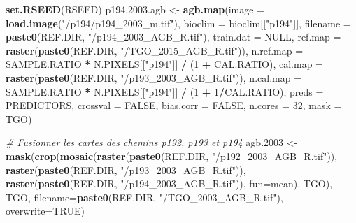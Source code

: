 \documentclass[a4paper, notitlepage, 12pt, krantz2]{krantz}
\newenvironment{Shaded}{\begin{snugshade}}{\end{snugshade}}
\newcommand{\CommentTok}[1]{\textcolor[rgb]{0.56,0.35,0.01}{\textit{#1}}}
\newcommand{\DataTypeTok}[1]{\textcolor[rgb]{0.13,0.29,0.53}{#1}}
\newcommand{\DecValTok}[1]{\textcolor[rgb]{0.00,0.00,0.81}{#1}}
\newcommand{\FloatTok}[1]{\textcolor[rgb]{0.00,0.00,0.81}{#1}}
\newcommand{\KeywordTok}[1]{\textcolor[rgb]{0.13,0.29,0.53}{\textbf{#1}}}
\newcommand{\NormalTok}[1]{#1}
\newcommand{\OperatorTok}[1]{\textcolor[rgb]{0.81,0.36,0.00}{\textbf{#1}}}
\newcommand{\OtherTok}[1]{\textcolor[rgb]{0.56,0.35,0.01}{#1}}
\newcommand{\StringTok}[1]{\textcolor[rgb]{0.31,0.60,0.02}{#1}}
\begin{document}
\begin{Shaded}
\begin{Highlighting}[]
{{{{\KeywordTok{set.RSEED}\NormalTok{(RSEED)}
\NormalTok{p194.}\FloatTok{2003.}\NormalTok{agb <-}\StringTok{ }\KeywordTok{agb.map}\NormalTok{(}\DataTypeTok{image     =} \KeywordTok{load.image}\NormalTok{(}\StringTok{"/p194/p194_2003_m.tif"}\NormalTok{), }
                         \DataTypeTok{bioclim   =}\NormalTok{ bioclim[[}\StringTok{"p194"}\NormalTok{]],}
                         \DataTypeTok{filename  =} \KeywordTok{paste0}\NormalTok{(REF.DIR, }\StringTok{"/p194_2003_AGB_R.tif"}\NormalTok{),}
                         \DataTypeTok{train.dat =} \OtherTok{NULL}\NormalTok{,}
                         \DataTypeTok{ref.map   =} \KeywordTok{raster}\NormalTok{(}\KeywordTok{paste0}\NormalTok{(REF.DIR, }\StringTok{"/TGO_2015_AGB_R.tif"}\NormalTok{)),}
                         \DataTypeTok{n.ref.map =}\NormalTok{ SAMPLE.RATIO }\OperatorTok{*}\StringTok{ }\NormalTok{N.PIXELS[[}\StringTok{"p194"}\NormalTok{]] }\OperatorTok{/}\StringTok{ }\NormalTok{(}\DecValTok{1} \OperatorTok{+}\StringTok{ }\NormalTok{CAL.RATIO),}
                         \DataTypeTok{cal.map   =} \KeywordTok{raster}\NormalTok{(}\KeywordTok{paste0}\NormalTok{(REF.DIR, }\StringTok{"/p193_2003_AGB_R.tif"}\NormalTok{)),}
                         \DataTypeTok{n.cal.map =}\NormalTok{ SAMPLE.RATIO }\OperatorTok{*}\StringTok{ }\NormalTok{N.PIXELS[[}\StringTok{"p194"}\NormalTok{]] }\OperatorTok{/}\StringTok{ }\NormalTok{(}\DecValTok{1} \OperatorTok{+}\StringTok{ }\DecValTok{1}\OperatorTok{/}\NormalTok{CAL.RATIO), }
                         \DataTypeTok{preds     =}\NormalTok{ PREDICTORS,}
                         \DataTypeTok{crossval  =} \OtherTok{FALSE}\NormalTok{,}
                         \DataTypeTok{bias.corr =} \OtherTok{FALSE}\NormalTok{,}
                         \DataTypeTok{n.cores   =} \DecValTok{32}\NormalTok{,}
                         \DataTypeTok{mask      =}\NormalTok{ TGO)}

\CommentTok{# Fusionner les cartes des chemins p192, p193 et p194}
\NormalTok{agb}\FloatTok{.2003}\NormalTok{ <-}\StringTok{ }\KeywordTok{mask}\NormalTok{(}\KeywordTok{crop}\NormalTok{(}\KeywordTok{mosaic}\NormalTok{(}\KeywordTok{raster}\NormalTok{(}\KeywordTok{paste0}\NormalTok{(REF.DIR, }\StringTok{"/p192_2003_AGB_R.tif"}\NormalTok{)),}
                             \KeywordTok{raster}\NormalTok{(}\KeywordTok{paste0}\NormalTok{(REF.DIR, }\StringTok{"/p193_2003_AGB_R.tif"}\NormalTok{)), }
                             \KeywordTok{raster}\NormalTok{(}\KeywordTok{paste0}\NormalTok{(REF.DIR, }\StringTok{"/p194_2003_AGB_R.tif"}\NormalTok{)),}
                             \DataTypeTok{fun=}\NormalTok{mean),}
\NormalTok{                      TGO), }
\NormalTok{                 TGO, }
                 \DataTypeTok{filename=}\KeywordTok{paste0}\NormalTok{(REF.DIR, }\StringTok{"/TGO_2003_AGB_R.tif"}\NormalTok{), }\DataTypeTok{overwrite=}\OtherTok{TRUE}\NormalTok{)}


}}}}
\end{Highlighting}
\end{Shaded}
\end{document}
